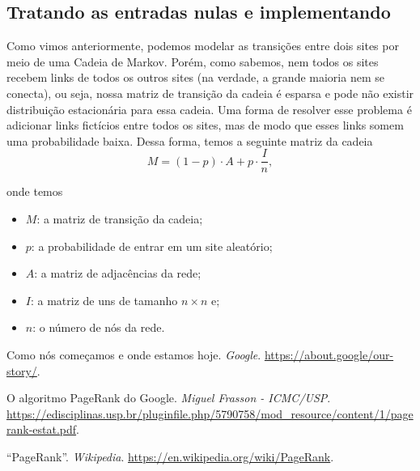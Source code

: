 \documentclass{article}
\begin{document}
\subsection*{Tratando as entradas nulas e implementando}


Como vimos anteriormente, podemos modelar as transições entre dois sites por meio de uma Cadeia de Markov. Porém, como sabemos, nem todos os sites recebem links de todos os outros sites (na verdade, a grande maioria nem se conecta), ou seja, nossa matriz de transição da cadeia é esparsa e pode não existir distribuição estacionária para essa cadeia. Uma forma de resolver esse problema é adicionar links fictícios entre todos os sites, mas de modo que esses links somem uma probabilidade baixa. Dessa forma, temos a seguinte matriz da cadeia
\[M = (1 - p)\cdot A + p\cdot \dfrac{I}{n},\]

\noindent onde temos
\begin{itemize}
    \item
        $M$: a matriz de transição da cadeia;
        
    \item
        $p$: a probabilidade de entrar em um site aleatório;
        
    \item
        $A$: a matriz de adjacências da rede;
        
    \item
        $I$: a matriz de uns de tamanho $n\times n$ e;
        
    \item
        $n$: o número de nós da rede.
\end{itemize}

\newpage
\begin{thebibliography}{9}

 Como nós começamos e onde estamos hoje. \textit{Google}. \url{https://about.google/our-story/}.

 O algoritmo PageRank do Google. \textit{Miguel Frasson - ICMC/USP}. \url{https://edisciplinas.usp.br/pluginfile.php/5790758/mod_resource/content/1/pagerank-estat.pdf}.

 ``PageRank''. \textit{Wikipedia}. \url{https://en.wikipedia.org/wiki/PageRank}.

\end{thebibliography}
\end{document}
